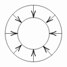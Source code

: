 \documentclass{article}
\begin{document}
\begin{example}
\[\begin{tikzpicture}[x=0.75pt,y=0.75pt,yscale=-1,xscale=1]
\draw   (326,107) .. controls (326,93.19) and (337.19,82) .. (351,82) .. controls (364.81,82) and (376,93.19) .. (376,107) .. controls (376,120.81) and (364.81,132) .. (351,132) .. controls (337.19,132) and (326,120.81) .. (326,107) -- cycle ;
\draw   (306.43,107) .. controls (306.43,82.38) and (326.38,62.43) .. (351,62.43) .. controls (375.62,62.43) and (395.57,82.38) .. (395.57,107) .. controls (395.57,131.62) and (375.62,151.57) .. (351,151.57) .. controls (326.38,151.57) and (306.43,131.62) .. (306.43,107) -- cycle ;
\draw    (306.43,107) -- (324,107) ;
\draw [shift={(326,107)}, rotate = 180] [color={rgb, 255:red, 0; green, 0; blue, 0 }  ][line width=0.75]    (10.93,-3.29) .. controls (6.95,-1.4) and (3.31,-0.3) .. (0,0) .. controls (3.31,0.3) and (6.95,1.4) .. (10.93,3.29)   ;
\draw    (351,62.43) -- (351,80) ;
\draw [shift={(351,82)}, rotate = 270] [color={rgb, 255:red, 0; green, 0; blue, 0 }  ][line width=0.75]    (10.93,-3.29) .. controls (6.95,-1.4) and (3.31,-0.3) .. (0,0) .. controls (3.31,0.3) and (6.95,1.4) .. (10.93,3.29)   ;
\draw    (318.24,76.86) -- (330.77,88.5) ;
\draw [shift={(332.24,89.86)}, rotate = 222.88] [color={rgb, 255:red, 0; green, 0; blue, 0 }  ][line width=0.75]    (10.93,-3.29) .. controls (6.95,-1.4) and (3.31,-0.3) .. (0,0) .. controls (3.31,0.3) and (6.95,1.4) .. (10.93,3.29)   ;
\draw    (395.57,107) -- (378,107) ;
\draw [shift={(376,107)}, rotate = 360] [color={rgb, 255:red, 0; green, 0; blue, 0 }  ][line width=0.75]    (10.93,-3.29) .. controls (6.95,-1.4) and (3.31,-0.3) .. (0,0) .. controls (3.31,0.3) and (6.95,1.4) .. (10.93,3.29)   ;
\draw    (385.24,77.86) -- (372.76,88.56) ;
\draw [shift={(371.24,89.86)}, rotate = 319.4] [color={rgb, 255:red, 0; green, 0; blue, 0 }  ][line width=0.75]    (10.93,-3.29) .. controls (6.95,-1.4) and (3.31,-0.3) .. (0,0) .. controls (3.31,0.3) and (6.95,1.4) .. (10.93,3.29)   ;
\draw    (351,151.57) -- (351,134) ;
\draw [shift={(351,132)}, rotate = 90] [color={rgb, 255:red, 0; green, 0; blue, 0 }  ][line width=0.75]    (10.93,-3.29) .. controls (6.95,-1.4) and (3.31,-0.3) .. (0,0) .. controls (3.31,0.3) and (6.95,1.4) .. (10.93,3.29)   ;
\draw    (380.24,141.86) -- (367.6,128.32) ;
\draw [shift={(366.24,126.86)}, rotate = 46.97] [color={rgb, 255:red, 0; green, 0; blue, 0 }  ][line width=0.75]    (10.93,-3.29) .. controls (6.95,-1.4) and (3.31,-0.3) .. (0,0) .. controls (3.31,0.3) and (6.95,1.4) .. (10.93,3.29)   ;
\draw    (319.24,138.86) -- (330.88,126.32) ;
\draw [shift={(332.24,124.86)}, rotate = 132.88] [color={rgb, 255:red, 0; green, 0; blue, 0 }  ][line width=0.75]    (10.93,-3.29) .. controls (6.95,-1.4) and (3.31,-0.3) .. (0,0) .. controls (3.31,0.3) and (6.95,1.4) .. (10.93,3.29)   ;


\end{tikzpicture}\]
\end{example}
\end{document}
